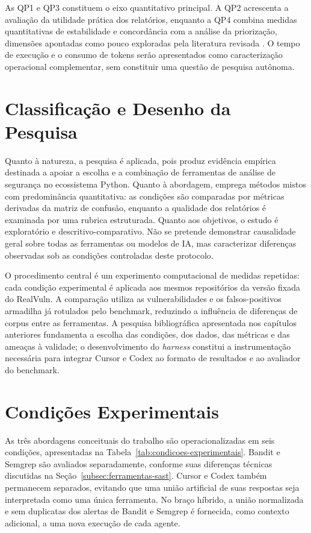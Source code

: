 As QP1 e QP3 constituem o eixo quantitativo principal. A QP2 acrescenta a avaliação da utilidade prática dos relatórios, enquanto a QP4 combina medidas quantitativas de estabilidade e concordância com a análise da priorização, dimensões apontadas como pouco exploradas pela literatura revisada \cite{Germano2025LLMSLR, Mao2025ExplainableVD, Tamberg2025LLMHarness}. O tempo de execução e o consumo de tokens serão apresentados como caracterização operacional complementar, sem constituir uma questão de pesquisa autônoma.

\section{Classificação e Desenho da Pesquisa}\label{sec:classificacao-pesquisa}

Quanto à natureza, a pesquisa é aplicada, pois produz evidência empírica destinada a apoiar a escolha e a combinação de ferramentas de análise de segurança no ecossistema Python. Quanto à abordagem, emprega métodos mistos com predominância quantitativa: as condições são comparadas por métricas derivadas da matriz de confusão, enquanto a qualidade dos relatórios é examinada por uma rubrica estruturada. Quanto aos objetivos, o estudo é exploratório e descritivo-comparativo. Não se pretende demonstrar causalidade geral sobre todas as ferramentas ou modelos de IA, mas caracterizar diferenças observadas sob as condições controladas deste protocolo.

O procedimento central é um experimento computacional de medidas repetidas: cada condição experimental é aplicada aos mesmos repositórios da versão fixada do RealVuln. A comparação utiliza as vulnerabilidades e os falsos-positivos armadilha já rotulados pelo benchmark, reduzindo a influência de diferenças de corpus entre as ferramentas. A pesquisa bibliográfica apresentada nos capítulos anteriores fundamenta a escolha das condições, dos dados, das métricas e das ameaças à validade; o desenvolvimento do \textit{harness} constitui a instrumentação necessária para integrar Cursor e Codex ao formato de resultados e ao avaliador do benchmark.

\section{Condições Experimentais}\label{sec:condicoes-experimentais}

As três abordagens conceituais do trabalho são operacionalizadas em seis condições, apresentadas na Tabela~\ref{tab:condicoes-experimentais}. Bandit e Semgrep são avaliados separadamente, conforme suas diferenças técnicas discutidas na Seção~\ref{subsec:ferramentas-sast}. Cursor e Codex também permanecem separados, evitando que uma união artificial de suas respostas seja interpretada como uma única ferramenta. No braço híbrido, a união normalizada e sem duplicatas dos alertas de Bandit e Semgrep é fornecida, como contexto adicional, a uma nova execução de cada agente.

